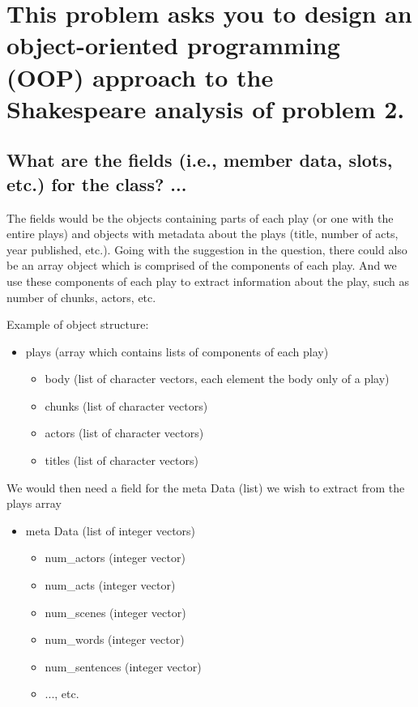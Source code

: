 \documentclass{article}\usepackage[]{graphicx}\usepackage[]{color}
\begin{document}
\section{This problem asks you to design an object-oriented programming (OOP) approach to the Shakespeare analysis of problem 2.}

\subsection{What are the fields (i.e., member data, slots, etc.) for the class? ...} %

The fields would be the objects containing parts of each play (or one with the entire plays) and objects with metadata about the plays (title, number of acts, year published, etc.). Going with the suggestion in the question, there could also be an array object which is comprised of the components of each play. And we use these components of each play to extract information about the play, such as number of chunks, actors, etc.

Example of  object structure:
\begin{itemize}
    \item plays (array which contains lists of components of each play)
    \begin{itemize}
        \item body (list of character vectors, each element the body only of a play)
        \item chunks (list of character vectors)
        \item actors (list of character vectors)
        \item titles (list of character vectors)
    \end{itemize}
\end{itemize}   

We would then need a field for the meta Data (list) we wish to extract from the plays array
\begin{itemize}
    \item meta Data (list of integer vectors)
    \begin{itemize}
        \item num\_actors (integer vector)
        \item num\_acts (integer vector)
        \item num\_scenes (integer vector)
        \item num\_words (integer vector)
        \item num\_sentences (integer vector)
        \item ..., etc.
    \end{itemize}
\end{itemize}
\end{document}
